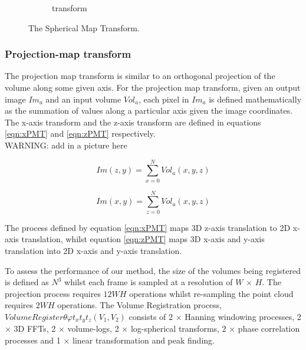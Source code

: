 \begin{figure}[t]
\begin{subfigure}[b]{4.2in}
                \caption{transform}
                \label{fig:bunnySPTed}
        \end{subfigure}%
        \caption{The Spherical Map Transform.}
       \label{fig:smtExample}
\end{figure}


\subsubsection{Projection-map transform}

The projection map transform is similar to an orthogonal projection of the volume along some given axis. For the projection map transform, given an output image $Im_a$ and an input volume $Vol_a$, each pixel in $Im_a$ is defined mathematically as the summation of values along a particular axis given the image coordinates. The x-axis transform and the z-axis transform are defined in equations \ref{eqn:xPMT} and \ref{eqn:zPMT} respectively. \\

WARNING: add in a picture here

\begin{equation} \label{eqn:xPMT}
Im(z,y) = \sum_{x=0}^{N}{Vol_a(x,y,z)}
\end{equation}

\begin{equation} \label{eqn:zPMT}
Im(x,y) = \sum_{z=0}^{N}{Vol_a(x,y,z)}
\end{equation}

The process defined by equation \ref{eqn:xPMT} maps 3D z-axis translation to 2D x-axis translation, whilst equation \ref{eqn:zPMT} maps 3D x-axis and y-axis translation into 2D x-axis and y-axis translation.


To assess the performance of our method, the size of the volumes being registered is defined as $N^3$ whilst each frame is sampled at a resolution of $W$ $\times$ $H$. The projection process requires $12WH$ operations whilst re-sampling the point cloud requires $2WH$ operations. The Volume Registration process, $VolumeRegister{\theta \varphi t_x t_y t_z}(V_1, V_2)$ consists of 2 $\times$ Hanning windowing processes, 2 $\times$ 3D FFTs, 2 $\times$ volume-logs, 2 $\times$ log-spherical transforms, 2 $\times$ phase correlation processes and 1 $\times$ linear transformation and peak finding. 

